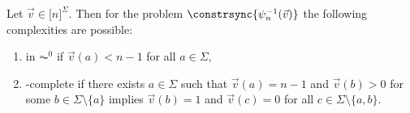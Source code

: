 \begin{lemma}
\label{constrsync:lem:comm:single-vector}
 Let $\vec{v} \in \mathbb [n]^{\Sigma}$.
 Then for the problem $\constrsync{\psi_n^{-1}(\vec{v})}$
 the following complexities are possible:
  
%  
%  
%  
\begin{enumerate}
\item \label{constrsync:comm:single:item:AC0} in $\AC^0$ if $\vec{v}(a) < n - 1$ for all $a \in \Sigma$,


\item \label{constrsync:comm:single:item:L} \LOGSPACE-complete if there exists $a \in \Sigma$ such that $\vec{v}(a) = n - 1$
and $\vec{v}(b) > 0$ for some $b \in \Sigma \setminus \{a\}$
implies $\vec{v}(b) = 1$ and $\vec{v}(c) = 0$ for all $c \in \Sigma\setminus\{a,b\}$.
%
%



\end{enumerate}
\end{lemma}
